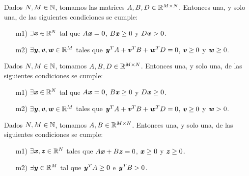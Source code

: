 \bigskip
\begin{teoremaBox}[Motzkin]
Dados $ N,M \in \mathbb{N} $, tomamos las matrices $ A,B,D \in \mathbb{R}^{M\times N} $. Entonces una, y solo una, de las siguientes condiciones se cumple:
\begin{itemize}
\item[m1)] $ \exists \textbf{\emph{x}} \in \mathbb{R}^N  $ tal que $ A\textbf{\emph{x}} = 0 $, $ B\textbf{\emph{x}} \geq 0 $ y $ D\textbf{\emph{x}} > 0$.
\item[m2)] $ \exists \textbf{\emph{y}}, \textbf{\emph{v}}, \textbf{\emph{w}} \in \mathbb{R}^M $ tales que $ \textbf{\emph{y}}^T A + \textbf{\emph{v}}^T B + \textbf{\emph{w}}^T D = 0 $, $ \textbf{\emph{v}} \geq 0 $ y $\textbf{\emph{w}} \geq 0 $.
\end{itemize} 
\end{teoremaBox}
\bigskip

\begin{teoremaBox}[Tucker]
Dados $ N,M \in \mathbb{N} $, tomamos $ A,B,D \in \mathbb{R}^{M\times N} $. Entonces una, y solo una, de las siguientes condiciones se cumple:
	\begin{itemize}
		\item[m1)] $ \exists \textbf{\emph{x}} \in \mathbb{R}^N  $ tal que $ A\textbf{\emph{x}} = 0 $, $ B\textbf{\emph{x}} \geq 0 $ y $ D\textbf{\emph{x}} \geq 0$.
		\item[m2)] $ \exists \textbf{\emph{y}}, \textbf{\emph{v}}, \textbf{\emph{w}} \in \mathbb{R}^M $ tales que $ \textbf{\emph{y}}^T A + \textbf{\emph{v}}^T B + \textbf{\emph{w}}^T D = 0 $, $ \textbf{\emph{v}} \geq 0 $ y $\textbf{\emph{w}} > 0 $.
	\end{itemize} 
\end{teoremaBox}
\bigskip

\begin{teoremaBox}
	Dados $ N,M \in \mathbb{N} $, tomamos $ A,B \in \mathbb{R}^{M\times N} $. Entonces una, y solo una, de las siguientes condiciones se cumple:
	\begin{itemize}
		\item[m1)] $ \exists \textbf{\emph{x}}, \textbf{\emph{z}} \in \mathbb{R}^N  $ tales que $ A\textbf{\emph{x}} + B\textbf{\emph{z}} = 0 $, $ \textbf{\emph{x}} \geq 0 $ y $ \textbf{\emph{z}} \geq 0$.
		\item[m2)] $ \exists \textbf{\emph{y}} \in \mathbb{R}^M $ tal que $ \textbf{\emph{y}}^T A \geq 0 $ e $ \textbf{\emph{y}}^T B > 0 $.
	\end{itemize} 
\end{teoremaBox}
\bigskip